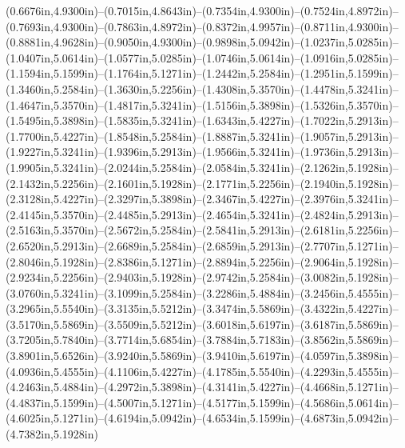 (0.6676in,4.9300in)--(0.7015in,4.8643in)--(0.7354in,4.9300in)--(0.7524in,4.8972in)--(0.7693in,4.9300in)--(0.7863in,4.8972in)--(0.8372in,4.9957in)--(0.8711in,4.9300in)--(0.8881in,4.9628in)--(0.9050in,4.9300in)--(0.9898in,5.0942in)--(1.0237in,5.0285in)--(1.0407in,5.0614in)--(1.0577in,5.0285in)--(1.0746in,5.0614in)--(1.0916in,5.0285in)--(1.1594in,5.1599in)--(1.1764in,5.1271in)--(1.2442in,5.2584in)--(1.2951in,5.1599in)--(1.3460in,5.2584in)--(1.3630in,5.2256in)--(1.4308in,5.3570in)--(1.4478in,5.3241in)--(1.4647in,5.3570in)--(1.4817in,5.3241in)--(1.5156in,5.3898in)--(1.5326in,5.3570in)--(1.5495in,5.3898in)--(1.5835in,5.3241in)--(1.6343in,5.4227in)--(1.7022in,5.2913in)--(1.7700in,5.4227in)--(1.8548in,5.2584in)--(1.8887in,5.3241in)--(1.9057in,5.2913in)--(1.9227in,5.3241in)--(1.9396in,5.2913in)--(1.9566in,5.3241in)--(1.9736in,5.2913in)--(1.9905in,5.3241in)--(2.0244in,5.2584in)--(2.0584in,5.3241in)--(2.1262in,5.1928in)--(2.1432in,5.2256in)--(2.1601in,5.1928in)--(2.1771in,5.2256in)--(2.1940in,5.1928in)--(2.3128in,5.4227in)--(2.3297in,5.3898in)--(2.3467in,5.4227in)--(2.3976in,5.3241in)--(2.4145in,5.3570in)--(2.4485in,5.2913in)--(2.4654in,5.3241in)--(2.4824in,5.2913in)--(2.5163in,5.3570in)--(2.5672in,5.2584in)--(2.5841in,5.2913in)--(2.6181in,5.2256in)--(2.6520in,5.2913in)--(2.6689in,5.2584in)--(2.6859in,5.2913in)--(2.7707in,5.1271in)--(2.8046in,5.1928in)--(2.8386in,5.1271in)--(2.8894in,5.2256in)--(2.9064in,5.1928in)--(2.9234in,5.2256in)--(2.9403in,5.1928in)--(2.9742in,5.2584in)--(3.0082in,5.1928in)--(3.0760in,5.3241in)--(3.1099in,5.2584in)--(3.2286in,5.4884in)--(3.2456in,5.4555in)--(3.2965in,5.5540in)--(3.3135in,5.5212in)--(3.3474in,5.5869in)--(3.4322in,5.4227in)--(3.5170in,5.5869in)--(3.5509in,5.5212in)--(3.6018in,5.6197in)--(3.6187in,5.5869in)--(3.7205in,5.7840in)--(3.7714in,5.6854in)--(3.7884in,5.7183in)--(3.8562in,5.5869in)--(3.8901in,5.6526in)--(3.9240in,5.5869in)--(3.9410in,5.6197in)--(4.0597in,5.3898in)--(4.0936in,5.4555in)--(4.1106in,5.4227in)--(4.1785in,5.5540in)--(4.2293in,5.4555in)--(4.2463in,5.4884in)--(4.2972in,5.3898in)--(4.3141in,5.4227in)--(4.4668in,5.1271in)--(4.4837in,5.1599in)--(4.5007in,5.1271in)--(4.5177in,5.1599in)--(4.5686in,5.0614in)--(4.6025in,5.1271in)--(4.6194in,5.0942in)--(4.6534in,5.1599in)--(4.6873in,5.0942in)--(4.7382in,5.1928in) 